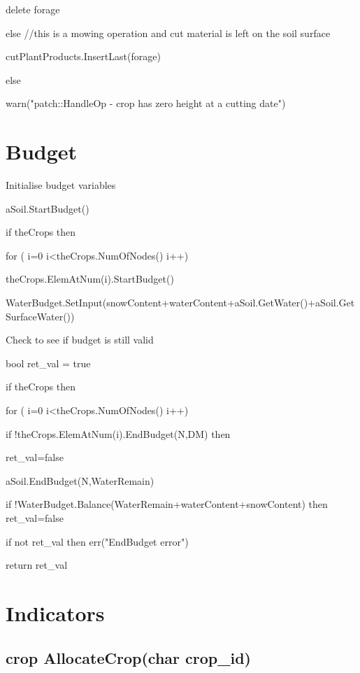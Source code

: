 \documentclass[%
]{scrartcl}
\begin{document}
{{{ \quad         delete forage
                  
                 
 else  //this is a mowing operation and cut material is left on the soil surface
                  

                    
  \quad         cutPlantProducts.InsertLast(forage)

   else

    \quad  warn("patch::HandleOp - crop has zero height at a cutting date")


\section{Budget}

Initialise budget variables

	aSoil.StartBudget()
	
   if theCrops then
   
     \quad	for ( i=0 i<theCrops.NumOfNodes() i++)
     
	  \quad  \quad   	theCrops.ElemAtNum(i).StartBudget()
	   	
   WaterBudget.SetInput(snowContent+waterContent+aSoil.GetWater()+aSoil.GetSurfaceWater())


Check to see if budget is still valid

	bool ret\_val = true
	
   
   if theCrops then
   
   \quad  	for ( i=0 i<theCrops.NumOfNodes() i++)
	
   \quad  	if !theCrops.ElemAtNum(i).EndBudget(N,DM) then
         
   \quad   \quad   ret\_val=false
 
  aSoil.EndBudget(N,WaterRemain)
   
if !WaterBudget.Balance(WaterRemain+waterContent+snowContent) then
   	ret\_val=false

   if not ret\_val then
      err("EndBudget error")
   
return ret\_val



\section{Indicators}

\subsection{crop   AllocateCrop(char    crop\_id)}

}}}
\end{document}
